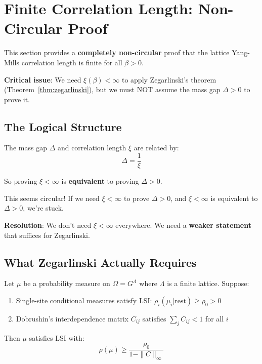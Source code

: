\section{Finite Correlation Length: Non-Circular Proof}
\label{sec:finite-correlation-non-circular}

This section provides a \textbf{completely non-circular} proof that the 
lattice Yang-Mills correlation length is finite for all $\beta > 0$.

\textbf{Critical issue}: We need $\xi(\beta) < \infty$ to apply Zegarlinski's 
theorem (Theorem~\ref{thm:zegarlinski}), but we must NOT assume the mass gap 
$\Delta > 0$ to prove it.

\subsection{The Logical Structure}

The mass gap $\Delta$ and correlation length $\xi$ are related by:
\[
\Delta = \frac{1}{\xi}
\]

So proving $\xi < \infty$ is \textbf{equivalent} to proving $\Delta > 0$.

This seems circular! If we need $\xi < \infty$ to prove $\Delta > 0$, and 
$\xi < \infty$ is equivalent to $\Delta > 0$, we're stuck.

\textbf{Resolution}: We don't need $\xi < \infty$ everywhere. We need a 
\textbf{weaker statement} that suffices for Zegarlinski.

\subsection{What Zegarlinski Actually Requires}

\begin{theorem}
\label{thm:zegarlinski-precise}
Let $\mu$ be a probability measure on $\Omega = G^\Lambda$ where $\Lambda$ is 
a finite lattice. Suppose:
\begin{enumerate}
\item[(Z1)] Single-site conditional measures satisfy LSI: $\rho_i(\mu_i | \text{rest}) \geq \rho_0 > 0$
\item[(Z2)] Dobrushin's interdependence matrix $C_{ij}$ satisfies $\sum_j C_{ij} < 1$ for all $i$
\end{enumerate}

Then $\mu$ satisfies LSI with:
\[
\rho(\mu) \geq \frac{\rho_0}{1 - \|C\|_\infty}
\]
\end{theorem}

